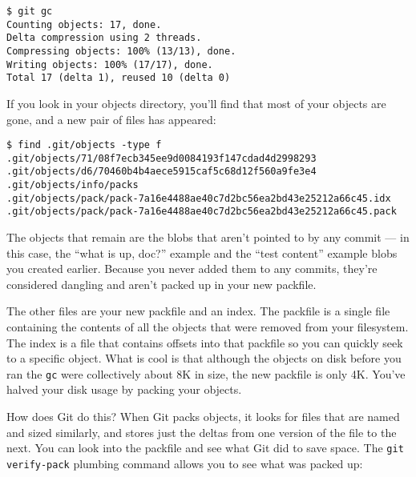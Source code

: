 \documentclass[a4paper]{book}
\begin{document}
\begin{shaded}\begin{verbatim}
$ git gc
Counting objects: 17, done.
Delta compression using 2 threads.
Compressing objects: 100% (13/13), done.
Writing objects: 100% (17/17), done.
Total 17 (delta 1), reused 10 (delta 0)
\end{verbatim}\end{shaded}

If you look in your objects directory, you'll find that most of your objects are gone, and a new pair of files has appeared:

\begin{shaded}\begin{verbatim}
$ find .git/objects -type f
.git/objects/71/08f7ecb345ee9d0084193f147cdad4d2998293
.git/objects/d6/70460b4b4aece5915caf5c68d12f560a9fe3e4
.git/objects/info/packs
.git/objects/pack/pack-7a16e4488ae40c7d2bc56ea2bd43e25212a66c45.idx
.git/objects/pack/pack-7a16e4488ae40c7d2bc56ea2bd43e25212a66c45.pack
\end{verbatim}\end{shaded}

The objects that remain are the blobs that aren't pointed to by any commit --- in this case, the “what is up, doc?” example and the “test content” example blobs you created earlier. Because you never added them to any commits, they're considered dangling and aren't packed up in your new packfile.

The other files are your new packfile and an index. The packfile is a single file containing the contents of all the objects that were removed from your filesystem. The index is a file that contains offsets into that packfile so you can quickly seek to a specific object. What is cool is that although the objects on disk before you ran the \texttt{gc} were collectively about 8K in size, the new packfile is only 4K. You've halved your disk usage by packing your objects.

How does Git do this? When Git packs objects, it looks for files that are named and sized similarly, and stores just the deltas from one version of the file to the next. You can look into the packfile and see what Git did to save space. The \texttt{git verify-pack} plumbing command allows you to see what was packed up:
\end{document}
